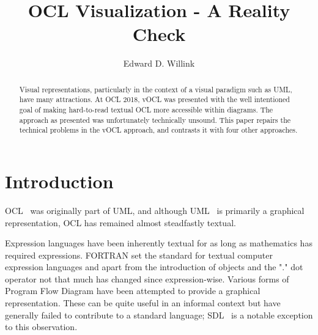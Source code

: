 \documentclass{llncs}
\begin{document}
%
\mainmatter              %
%
\title{OCL Visualization - A Reality Check}
%
%
\author{Edward D. Willink}
%
%
%


\maketitle              %

\begin{abstract}
Visual representations, particularly in the context of a visual paradigm such as UML, have many attractions. At OCL 2018, vOCL was presented with the well intentioned goal of making hard-to-read textual OCL more accessible within diagrams. The approach as presented was unfortunately technically unsound. This paper repairs the technical problems in the vOCL approach, and contrasts it with four other approaches.

\end{abstract}
%
\section{Introduction}
%
OCL~\cite{OCL-2.4} was originally part of UML, and although UML~\cite{UML-2.5} is primarily a graphical representation, OCL has remained almost steadfastly textual. %

Expression languages have been inherently textual for as long as mathematics has required expressions. FORTRAN set the standard for textual computer expression languages and apart from the introduction of objects and the "." dot operator not that much has changed since expression-wise.  Various forms of Program Flow Diagram have been attempted to provide a graphical representation. These can be quite useful in an informal context but have generally failed to contribute to a standard language; SDL~\cite{SDL} is a notable exception to this observation.
\end{document}
